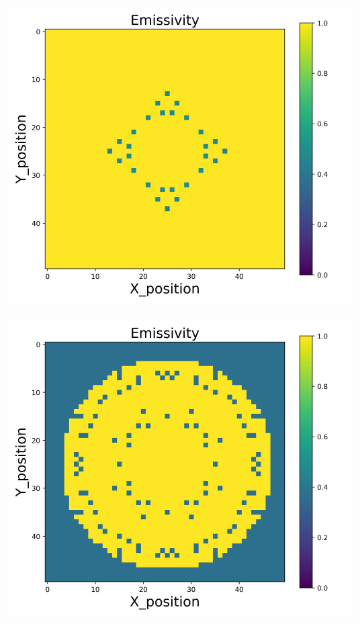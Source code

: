 \begin{figure}[p]
    \centering
    \begin{minipage}{\textwidth}
        \centering
        \begin{subfigure}{0.325\textwidth}
            \centering
            \includegraphics[width=\textwidth]{figures/raw_data/0/exp/emi_cal.jpg}
        \end{subfigure}
        \begin{subfigure}{0.325\textwidth}
            \centering
            \includegraphics[width=\textwidth]{figures/raw_data/5/exp/emi_cal.jpg}

\end{subfigure}
\end{minipage}
\end{figure}

